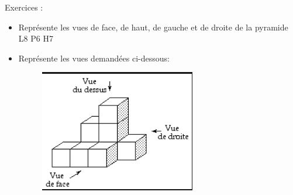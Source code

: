 \documentclass[a4paper, 12 pt]{article}
\begin{document}
            \newpage
    Exercices :\begin{itemize}
        \item Représente les vues de face, de haut, de gauche et de droite de la pyramide L8 P6 H7 \vspace{1\baselineskip}
        \item Représente les vues demandées ci-dessous: \begin{figure}[H]
            \centering
            \includegraphics[width = 0.9\linewidth]{img/cubes.PNG}
            
        \end{figure}
        
    \end{itemize}
    
    
\end{document}
